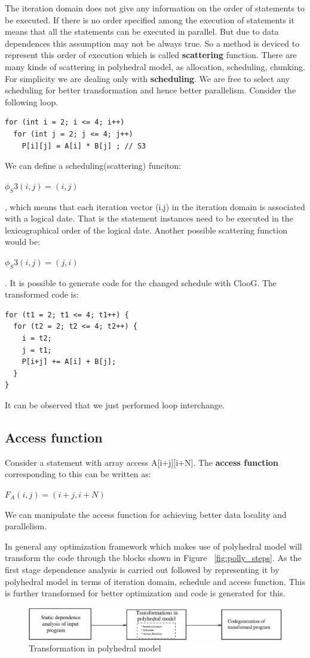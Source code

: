 The iteration domain does not give any information on the order of statements to be executed. If there
is no order specified among the execution of statements it means that all the statements can be executed
in parallel. But due to data dependences this assumption may not be always true. So a method is deviced
to represent this order of execution which is called \textbf{scattering} function. There are many
kinds of scattering in polyhedral model, as allocation, scheduling, chunking. For simplicity
we are dealing only with \textbf{scheduling}. We are free to select any scheduling for better
transformation and hence better parallelism.
Consider the following loop.
{\footnotesize
\begin{lstlisting}
for (int i = 2; i <= 4; i++)
  for (int j = 2; j <= 4; j++)
    P[i][j] = A[i] * B[j] ; // S3
\end{lstlisting}
}
We can define a scheduling(scattering) funciton:
\begin{center}
$\phi_S3(i,j) = (i,j)$
\end{center}, which means that each iteration vector (i,j) in the iteration domain is associated with
a logical date. That is the statement instances need to be executed in the lexicographical order of the
logical date. Another possible scattering function would be:
\begin{center}
$\phi_S3(i,j) = (j,i)$
\end{center}. It is possible to generate code for the changed schedule with ClooG\cite{cloog}. The
transformed code is:
{\footnotesize
\begin{lstlisting}
for (t1 = 2; t1 <= 4; t1++) {
  for (t2 = 2; t2 <= 4; t2++) {
    i = t2;
    j = t1;
    P[i+j] += A[i] + B[j];
  }
}
\end{lstlisting}
}
It can be observed that we just performed loop interchange.

\subsection{Access function}
Consider a statement with array access A[i+j][i+N]. The \textbf{access function} corresponding to this can be written
as:
\begin{center}
$F_A(i,j) = (i+j,i+N)$
\end{center}
We can manipulate the access function for achieving better data locality and parallelism.

In general any optimization framework which makes use of polyhedral model will
transform the code through the blocks shown in Figure ~\ref{fig:polly_steps}.
As the first stage dependence analysis is carried out followed by representing
it by polyhedral model in terms of iteration domain, schedule and access function.
This is further transformed for better optimization and code is generated
for this.
\begin{figure}
  \label{fig:poly_steps}
  \includegraphics[width=1\textwidth]{images/poly_steps.eps}
  \caption{Transformation in polyhedral model}
\end{figure}
